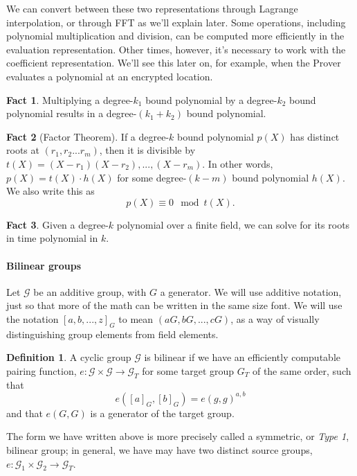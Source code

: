 \documentclass{article}
\theoremstyle{definition}
\newtheorem{definition}{Definition}[section]
\newtheorem{fact}{Fact}[section]
\theoremstyle{remark}
\begin{document}
We can convert between these two representations through Lagrange interpolation, or through FFT as we'll explain later.
Some operations, including polynomial multiplication and division, can be computed more efficiently in the evaluation representation. Other times, however, it's necessary to work with the coefficient representation. We'll see this later on, for example, when the Prover evaluates a polynomial at an encrypted location.

\begin{fact}
Multiplying a degree-$k_1$ bound polynomial by a degree-$k_2$ bound polynomial results in a degree-$(k_1+k_2)$ bound polynomial.
\end{fact}
\begin{fact}[Factor Theorem]
If a degree-$k$ bound polynomial $p(X)$ has distinct roots at $(r_1,r_2...r_m)$, then it is divisible by $t(X) = (X-r_1)(X-r_2),...,(X-r_m)$.
In other words, $p(X) = t(X) \cdot h(X)$ for some degree-$(k-m)$ bound polynomial $h(X)$.
We also write this as
\[
   p(X) \equiv 0 \mod t(X).
\]
\end{fact}
\begin{fact}
Given a degree-$k$ polynomial over a finite field, we can solve for its roots in time polynomial in $k$.
\end{fact}

\paragraph{Bilinear groups}
Let $\mathcal{G}$ be an additive group, with $G$ a generator.
We will use additive notation, just so that more of the math can be written in the same size font.
We will use the notation $\left[a, b, ..., z\right]_G$ to mean $(aG, bG, ..., cG)$, as a way of visually distinguishing group elements from field elements.

\begin{definition}
A cyclic group $\mathcal{G}$ is bilinear if we have an efficiently computable pairing function, $e : \mathcal{G} \times \mathcal{G} \rightarrow \mathcal{G}_T$ for some target group $G_T$ of the same order, such that 
    $$e( \left[a\right]_G, \left[b\right]_G) = e(g,g)^{a,b}$$
and that $e(G,G)$ is a generator of the target group.
\end{definition}

The form we have written above is more precisely called a symmetric, or \emph{Type 1}, bilinear group; in general, we have may have two distinct source groups, $e : \mathcal{G}_1 \times \mathcal{G_2} \rightarrow \mathcal{G}_T$.
\end{document}
